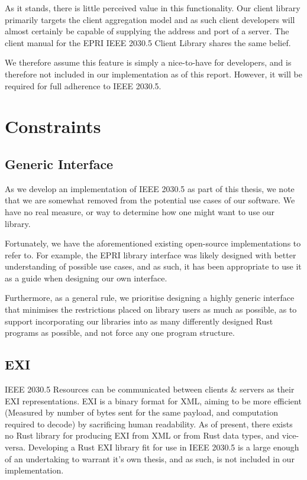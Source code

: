 As it stands, there is little perceived value in this functionality. Our client library primarily targets the client aggregation model and as such client developers will almost certainly be capable of supplying the address and port of a server.
The client manual for the EPRI IEEE 2030.5 Client Library shares the same belief. \cite{eprimanual}

We therefore assume this feature is simply a nice-to-have for developers, and is therefore not included in our implementation as of this report. However, it will be required for full adherence to IEEE 2030.5.

\section{Constraints}

\subsection{Generic Interface}
As we develop an implementation of IEEE 2030.5 as part of this thesis, we note that we are somewhat removed from the potential use cases of our software. We have no real measure, or way to determine how one might want to use our library. 

Fortunately, we have the aforementioned existing open-source implementations to refer to. For example, the EPRI library interface was likely designed with better understanding of possible use cases, and as such, it has been appropriate to use it as a guide when designing our own interface.

Furthermore, as a general rule, we prioritise designing a highly generic interface that minimises the restrictions placed on library users as much as possible, as to support incorporating our libraries into as many differently designed Rust programs as possible, and not force any one program structure.

\subsection{EXI}
IEEE 2030.5 Resources can be communicated between clients \& servers as their EXI representations. EXI is a binary format for XML, aiming to be more efficient (Measured by number of bytes sent for the same payload, and computation required to decode) by sacrificing human readability. As of present, there exists no Rust library for producing EXI from XML or from Rust data types, and vice-versa.
Developing a Rust EXI library fit for use in IEEE 2030.5 is a large enough of an undertaking to warrant it's own thesis, and as such, is not included in our implementation.

